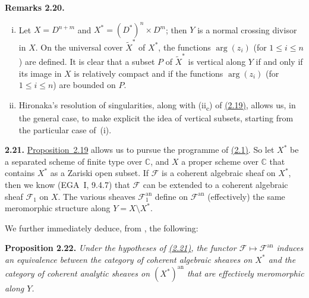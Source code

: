 \documentclass{report}
\newenvironment{itenv}[1]
  {\phantomsection\par\medskip\noindent\textbf{#1.}\itshape}
  {\par\medskip}
\newenvironment{rmenv}[1]
  {\phantomsection\par\medskip\noindent\textbf{#1.}\rmfamily}
  {\par\medskip}
\newcommand{\scr}[1]{{\mathscr{#1}}}
\newcommand{\CC}{\mathbb{C}}
\newcommand{\an}{\mathrm{an}}
\renewcommand{\leq}{\leqslant}
\begin{document}
\begin{rmenv}{Remarks 2.20}
  \begin{enumerate}[(i)]
    \item Let $X=D^{n+m}$ and $X^*=(D^*)^n\times D^m$;
      then $Y$ is a normal crossing divisor in $X$.
      On the universal cover $\widetilde{X}^*$ of $X^*$, the functions $\arg(z_i)$ (for $1\leq i\leq n$) are defined.
      It is clear that a subset $P$ of $\widetilde{X}^*$ is vertical along $Y$ if and only if its image in $X$ is relatively compact and if the functions $\arg(z_i)$ (for $1\leq i\leq n$) are bounded on $P$.
    \item Hironaka's resolution of singularities, along with (ii\textsubscript{c}) of \hyperref[II.2.19]{(2.19)}, allows us, in the general case, to make explicit the idea of vertical subsets, starting from the particular case of~(i).
  \end{enumerate}
\end{rmenv}

\begin{rmenv}{2.21}
\label{II.2.21}
  \hyperref[II.2.19]{Proposition~2.19} allows us to pursue the programme of \hyperref[II.2.1]{(2.1)}.
  So let $X^*$ be a separated scheme of finite type over $\CC$, and $X$ a proper scheme over $\CC$ that contains $X^*$ as a Zariski open subset.
  If $\scr{F}$ is a coherent algebraic sheaf on $X^*$, then we know (EGA~I, 9.4.7) that $\scr{F}$ can be extended to a coherent algebraic sheaf $\scr{F}_1$ on $X$.
  The various sheaves $\scr{F}_1^\an$ define on $\scr{F}^\an$ (effectively) the same meromorphic structure along $Y=X\setminus X^*$.
\end{rmenv}

We further immediately deduce, from \cite{GAGA}, the following:

\begin{itenv}{Proposition 2.22}
\label{II.2.22}
  Under the hypotheses of \hyperref[II.2.21]{(2.21)}, the functor $\scr{F}\mapsto\scr{F}^\an$ induces an equivalence between the category of coherent algebraic sheaves on $X^*$ and the category of coherent analytic sheaves on $(X^*)^\an$ that are effectively meromorphic along $Y$.
\end{itenv}
\end{document}
